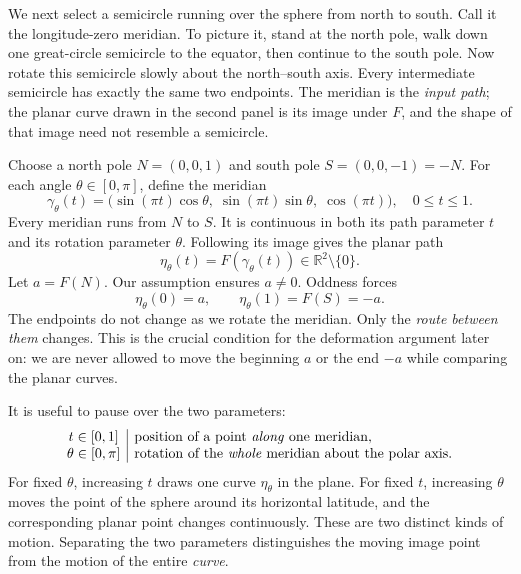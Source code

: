 We next select a semicircle running over the sphere from north to south. Call it the longitude-zero meridian. To picture it, stand at the north pole, walk down one great-circle semicircle to the equator, then continue to the south pole. Now rotate this semicircle slowly about the north--south axis. Every intermediate semicircle has exactly the same two endpoints. The meridian is the \emph{input path}; the planar curve drawn in the second panel is its image under \(F\), and the shape of that image need not resemble a semicircle.

Choose a north pole \(N=(0,0,1)\) and south pole \(S=(0,0,-1)=-N\). For each angle \(\theta\in[0,\pi]\), define the meridian
\begin{equation}
 \gamma_\theta(t)=
 \bigl(\sin(\pi t)\cos\theta,\;
       \sin(\pi t)\sin\theta,\;
       \cos(\pi t)\bigr),\quad 0\leq t\leq1.
 \label{eq:N20261110-meridians}
\end{equation}
Every meridian runs from $N$ to $S$. It is continuous in both its path parameter $t$ and its rotation parameter $\theta$. Following its image gives the planar path
\begin{equation}
 \eta_\theta(t)=F(\gamma_\theta(t))
 \in\mathbb R^2\setminus\{0\}.
 \label{eq:N20261110-eta}
\end{equation}
Let $a=F(N)$. Our assumption ensures $a\ne0$. Oddness forces
\begin{equation}
 \eta_\theta(0)=a,
 \qquad\eta_\theta(1)=F(S)=-a.
 \label{eq:N20261110-endpoints}
\end{equation}
The endpoints do not change as we rotate the meridian. Only the \emph{route between them} changes. This is the crucial condition for the deformation argument later on: we are never allowed to move the beginning \(a\) or the end \(-a\) while comparing the planar curves.

It is useful to pause over the two parameters:
\[
 \begin{array}{c|l}
 t\in[0,1]&\text{position of a point \emph{along} one meridian,}\\
 \theta\in[0,\pi]&\text{rotation of the \emph{whole} meridian about the polar axis.}
 \end{array}
\]
For fixed \(\theta\), increasing \(t\) draws one curve \(\eta_\theta\) in the plane. For fixed \(t\), increasing \(\theta\) moves the point of the sphere around its horizontal latitude, and the corresponding planar point changes continuously. These are two distinct kinds of motion. Separating the two parameters distinguishes the moving image point from the motion of the entire \emph{curve}.

